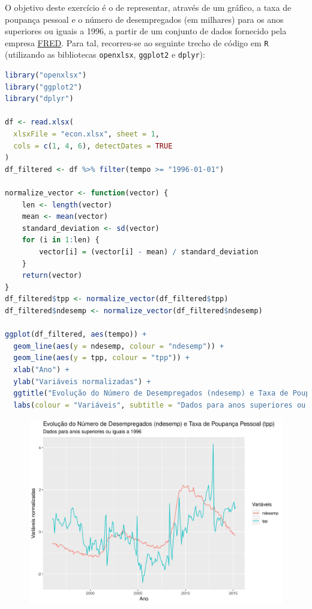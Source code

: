 \documentclass[12pt,a4paper]{article}
\begin{document}
O objetivo deste exercício é o de representar, através de um gráfico, a taxa de poupança pessoal e o número de desempregados (em milhares)
para os anos superiores ou iguais a 1996, a partir de um conjunto de dados fornecido pela empresa \href{https://fred.stlouisfed.org/}{FRED}.
Para tal, recorreu-se ao seguinte trecho de código em \texttt{R} (utilizando as bibliotecas \texttt{openxlsx}, \texttt{ggplot2} e \texttt{dplyr}):

\quad

\begin{lstlisting}[language=R]
library("openxlsx")
library("ggplot2")
library("dplyr")

df <- read.xlsx(
  xlsxFile = "econ.xlsx", sheet = 1,
  cols = c(1, 4, 6), detectDates = TRUE
)
df_filtered <- df %>% filter(tempo >= "1996-01-01")

normalize_vector <- function(vector) {
    len <- length(vector)
    mean <- mean(vector)
    standard_deviation <- sd(vector)
    for (i in 1:len) {
        vector[i] = (vector[i] - mean) / standard_deviation
    }
    return(vector)
}
df_filtered$tpp <- normalize_vector(df_filtered$tpp)
df_filtered$ndesemp <- normalize_vector(df_filtered$ndesemp)

ggplot(df_filtered, aes(tempo)) +
  geom_line(aes(y = ndesemp, colour = "ndesemp")) +
  geom_line(aes(y = tpp, colour = "tpp")) +
  xlab("Ano") +
  ylab("Variáveis normalizadas") +
  ggtitle("Evolução do Número de Desempregados (ndesemp) e Taxa de Poupança Pessoal (tpp)") +
  labs(colour = "Variáveis", subtitle = "Dados para anos superiores ou iguais a 1996")
\end{lstlisting}

\quad

\begin{figure}[h]
  \centering
  \includegraphics[scale = 0.8]{./ex01.png}
\end{figure}
\end{document}
